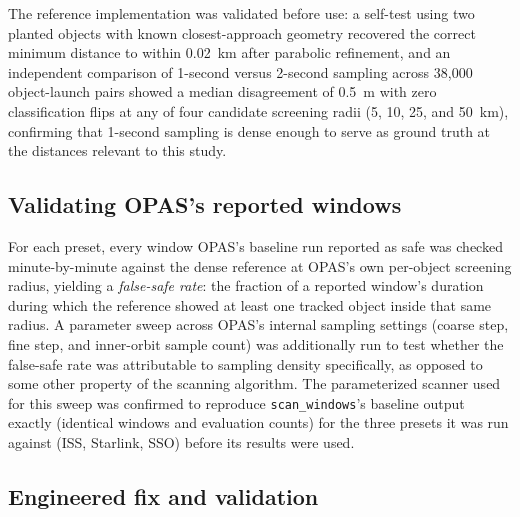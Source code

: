 \documentclass[11pt,a4paper]{article}
\begin{document}
The reference implementation was validated before use: a self-test using
two planted objects with known closest-approach geometry recovered the
correct minimum distance to within 0.02~km after parabolic refinement, and
an independent comparison of 1-second versus 2-second sampling across
38{,}000 object-launch pairs showed a median disagreement of 0.5~m with zero
classification flips at any of four candidate screening radii (5, 10, 25, and
50~km), confirming that 1-second sampling is dense enough to serve as ground
truth at the distances relevant to this study.

\subsection{Validating OPAS's reported windows}

For each preset, every window OPAS's baseline run reported as safe was
checked minute-by-minute against the dense reference at OPAS's own
per-object screening radius, yielding a \emph{false-safe rate}: the
fraction of a reported window's duration during which the reference showed
at least one tracked object inside that same radius. A parameter sweep
across OPAS's internal sampling settings (coarse step, fine step, and
inner-orbit sample count) was additionally run to test whether the
false-safe rate was attributable to sampling density specifically, as
opposed to some other property of the scanning algorithm. The parameterized
scanner used for this sweep was confirmed to reproduce \texttt{scan\_windows}'s
baseline output exactly (identical windows and evaluation counts) for the
three presets it was run against (ISS, Starlink, SSO) before its results were
used.

\subsection{Engineered fix and validation}
\end{document}

